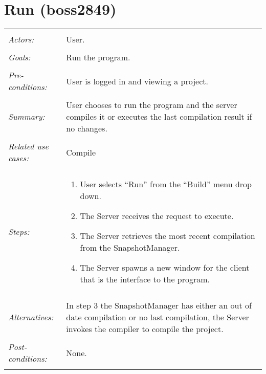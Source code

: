 \documentclass[11pt]{report}
\begin{document}
\section{Run (boss2849)}
\begin{tabular}{ p{2cm} p{12cm} }
 \hline
 \\
 \textit{Actors:} & User. \\ 
 \\
 \textit{Goals:} & Run the program. \\
 \\
 \textit{Pre-conditions:} & User is logged in and viewing a project. \\
 \\
 \textit{Summary:} & User chooses to run the program and the server compiles it or executes the last compilation result if no changes. \\
 \\
 \textit{Related use cases:} & Compile \\ 
 \\
 \textit{Steps:} & \begin{enumerate}
  \item User selects ``Run'' from the ``Build'' menu drop down.
  \item The Server receives the request to execute.
  \item The Server retrieves the most recent compilation from the SnapshotManager.
  \item The Server spawns a new window for the client that is the interface to the program.
 \end{enumerate} \\
 \\
 \textit{Alternatives:} & In step 3 the SnapshotManager has either an out of date compilation or no last compilation, the Server invokes the compiler to compile the project. \\
 \\
 \textit{Post-conditions:} & None. \\
 \\
\hline
\end{tabular}
\end{document}
